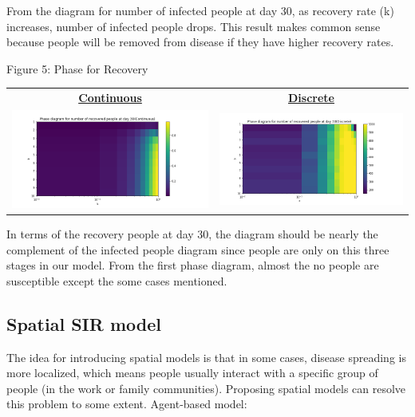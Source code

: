 \documentclass[11pt,a4paper]{article}
\begin{document}
\medskip \noindent
From the diagram for number of infected people at day 30, as recovery rate (k) increases, number of infected people drops. This result makes common sense because people will be removed from disease if they have higher recovery rates. 



  \begin{center}
 	Figure 5: Phase for Recovery
 \end{center}
 \begin{center}
 	
 	\begin{tabular}{c c}
 		\textbf{\underline{Continuous}} &
 		\textbf{\underline{Discrete}} \\
 		\includegraphics[width=.5\textwidth]{Phase_Continuous_R.png} & \includegraphics[width=.5\textwidth]{Phase_Discrete_R.png}
 	\end{tabular}
 
 \end{center}

\medskip \noindent
In terms of the recovery people at day 30, the diagram should be nearly the complement of the infected people diagram since people are only on this three stages in our model. From the first phase diagram, almost the no people are susceptible except the some cases mentioned. 


\subsection*{Spatial SIR model}
The idea for introducing spatial models is that in some cases, disease spreading is more localized, which means people usually interact with a specific group of people (in the work or family communities). Proposing spatial models can resolve this problem to some extent. 
\medskip \noindent \newline
Agent-based model:
\end{document}
